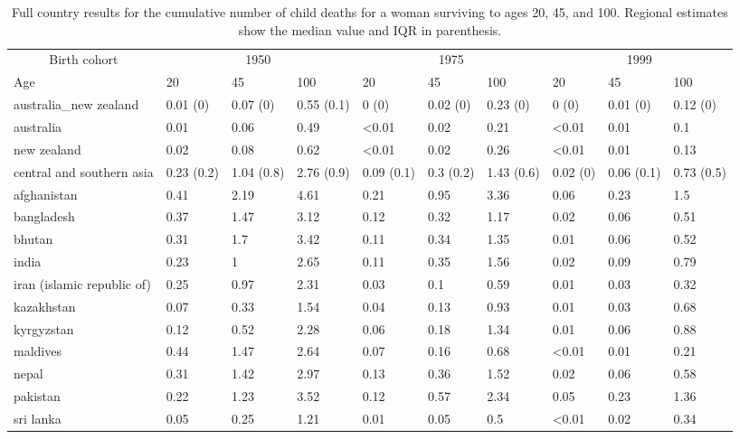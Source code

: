 \begin{table}[!h]

\caption{\label{tab:S5}Full country results for the cumulative number of child deaths for a woman surviving to ages 20, 45, and 100. Regional estimates show the median value and IQR in parenthesis.}
\centering
\begin{tabular}[t]{llllllllll}
\toprule
\multicolumn{1}{c}{Birth cohort} & \multicolumn{3}{c}{1950} & \multicolumn{3}{c}{1975} & \multicolumn{3}{c}{1999} \\
\cmidrule(l{3pt}r{3pt}){1-1} \cmidrule(l{3pt}r{3pt}){2-4} \cmidrule(l{3pt}r{3pt}){5-7} \cmidrule(l{3pt}r{3pt}){8-10}
Age & 20 & 45 & 100 & 20 & 45 & 100 & 20 & 45 & 100\\
\midrule
australia\_new zealand & 0.01 (0) & 0.07 (0) & 0.55 (0.1) & 0 (0) & 0.02 (0) & 0.23 (0) & 0 (0) & 0.01 (0) & 0.12 (0)\\
australia & 0.01 & 0.06 & 0.49 & <0.01 & 0.02 & 0.21 & <0.01 & 0.01 & 0.1\\
new zealand & 0.02 & 0.08 & 0.62 & <0.01 & 0.02 & 0.26 & <0.01 & 0.01 & 0.13\\
central and southern asia & 0.23 (0.2) & 1.04 (0.8) & 2.76 (0.9) & 0.09 (0.1) & 0.3 (0.2) & 1.43 (0.6) & 0.02 (0) & 0.06 (0.1) & 0.73 (0.5)\\
afghanistan & 0.41 & 2.19 & 4.61 & 0.21 & 0.95 & 3.36 & 0.06 & 0.23 & 1.5\\
\addlinespace
bangladesh & 0.37 & 1.47 & 3.12 & 0.12 & 0.32 & 1.17 & 0.02 & 0.06 & 0.51\\
bhutan & 0.31 & 1.7 & 3.42 & 0.11 & 0.34 & 1.35 & 0.01 & 0.06 & 0.52\\
india & 0.23 & 1 & 2.65 & 0.11 & 0.35 & 1.56 & 0.02 & 0.09 & 0.79\\
iran (islamic republic of) & 0.25 & 0.97 & 2.31 & 0.03 & 0.1 & 0.59 & 0.01 & 0.03 & 0.32\\
kazakhstan & 0.07 & 0.33 & 1.54 & 0.04 & 0.13 & 0.93 & 0.01 & 0.03 & 0.68\\
\addlinespace
kyrgyzstan & 0.12 & 0.52 & 2.28 & 0.06 & 0.18 & 1.34 & 0.01 & 0.06 & 0.88\\
maldives & 0.44 & 1.47 & 2.64 & 0.07 & 0.16 & 0.68 & <0.01 & 0.01 & 0.21\\
nepal & 0.31 & 1.42 & 2.97 & 0.13 & 0.36 & 1.52 & 0.02 & 0.06 & 0.58\\
pakistan & 0.22 & 1.23 & 3.52 & 0.12 & 0.57 & 2.34 & 0.05 & 0.23 & 1.36\\
sri lanka & 0.05 & 0.25 & 1.21 & 0.01 & 0.05 & 0.5 & <0.01 & 0.02 & 0.34\\

\end{tabular}
\end{table}
